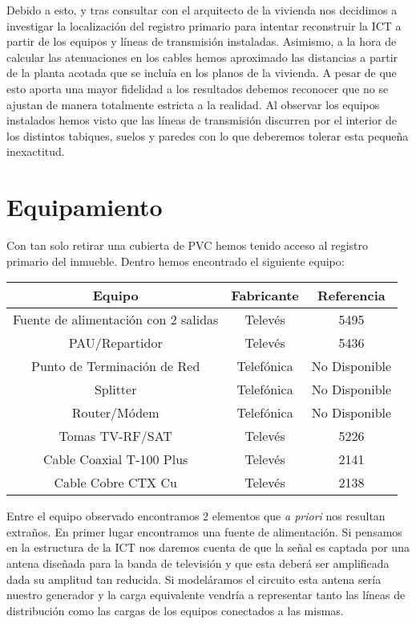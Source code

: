 \documentclass{article}[12 pt]
\begin{document}
		Debido a esto, y tras consultar con el arquitecto de la vivienda nos decidimos a investigar la localización del registro primario para intentar reconstruir la ICT a partir de los equipos y líneas de transmisión instaladas. Asimismo, a la hora de calcular las atenuaciones en los cables hemos aproximado las distancias a partir de la planta acotada que se incluía en los planos de la vivienda. A pesar de que esto aporta una mayor fidelidad a los resultados debemos reconocer que no se ajustan de manera totalmente estricta a la realidad. Al observar los equipos instalados hemos visto que las líneas de transmisión discurren por el interior de los distintos tabiques, suelos y paredes con lo que deberemos tolerar esta pequeña inexactitud.

	\section{Equipamiento}
		Con tan solo retirar una cubierta de PVC hemos tenido acceso al registro primario del inmueble. Dentro hemos encontrado el siguiente equipo:

		\vskip 3mm

		\begin{center}
			\begin{tabular}{| c | c | c |}
				\hline
				\textbf{Equipo} & \textbf{Fabricante} & \textbf{Referencia}\\
				\hline
				Fuente de alimentación con 2 salidas & Televés & 5495\\
				\hline
				PAU/Repartidor & Televés & 5436\\
				\hline
				Punto de Terminación de Red & Telefónica & No Disponible\\
				\hline
				Splitter & Telefónica & No Disponible\\
				\hline
				Router/Módem & Telefónica & No Disponible\\
				\hline
				Tomas TV-RF/SAT & Televés & 5226\\
				\hline
				Cable Coaxial T-100 Plus & Televés & 2141\\
				\hline
				Cable Cobre CTX Cu & Televés & 2138\\
				\hline
			\end{tabular}
		\end{center}

		\vskip 3mm

		Entre el equipo observado encontramos 2 elementos que \textit{a priori} nos resultan extraños. En primer lugar encontramos una fuente de alimentación. Si pensamos en la estructura de la ICT nos daremos cuenta de que la señal es captada por una antena diseñada para la banda de televisión y que esta deberá ser amplificada dada su amplitud tan reducida. Si modeláramos el circuito esta antena sería nuestro generador y la carga equivalente vendría a representar tanto las líneas de distribución como las cargas de los equipos conectados a las mismas.\\
\end{document}

